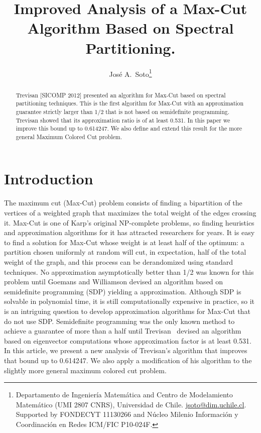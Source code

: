 \documentclass{article}
\theoremstyle{definition}
\theoremstyle{remark}
\numberwithin{equation}{section}
\begin{document}
\title{Improved Analysis of a Max-Cut Algorithm Based on Spectral Partitioning.}


\author{Jos\'e A.~Soto\thanks{
Departamento de Ingenier\'ia Matem\'atica and Centro de Modelamiento Matem\'atico (UMI
2807 CNRS), Universidad de Chile. \url{jsoto@dim.uchile.cl}. Supported by FONDECYT 11130266 and N\'ucleo Milenio Informaci\'on y Coordinaci\'on en Redes ICM/FIC P10-024F.}}


\maketitle
\begin{abstract}
Trevisan [SICOMP 2012] presented an algorithm for Max-Cut based on spectral partitioning techniques. This is the first algorithm for Max-Cut with an approximation 
guarantee strictly larger than 1/2 that is not based on semidefinite programming. Trevisan showed that its approximation ratio is of at least 0.531. In  this paper we improve this bound up to 0.614247. We also define and extend this result for the more general Maximum Colored Cut problem.
\end{abstract}

\section{Introduction}
The maximum cut (Max-Cut) problem consists of finding a bipartition of the vertices of a weighted graph that maximizes the total weight of the edges crossing it. Max-Cut is one of Karp's original NP-complete problems, so finding heuristics and approximation algorithms for it has 
attracted researchers for years. It is easy to find a solution for Max-Cut whose weight is at least half of the optimum: a partition chosen 
uniformly at random will cut, in expectation, half of the total weight of the graph, and this process can be derandomized using standard 
techniques.
No approximation asymptotically better than 1/2 was known for this problem until Goemans and Williamson \cite{GW} devised an algorithm based on 
semidefinite programming (SDP) yielding a  approximation. Although  SDP is 
solvable in polynomial time, it is still computationally expensive in practice, so it is an intriguing question to develop approximation algorithms 
for Max-Cut that do not use SDP. Semidefinite programming was the only known method to achieve a guarantee of more than a half until 
Trevisan~\cite{Luca} devised an algorithm based on eigenvector computations whose approximation factor is at least 0.531. In this article, we present 
a new analysis of Trevisan's algorithm that improves that bound up to 0.614247. We also apply a modification of his algorithm to the slightly more 
general maximum colored cut problem.
\end{document}
